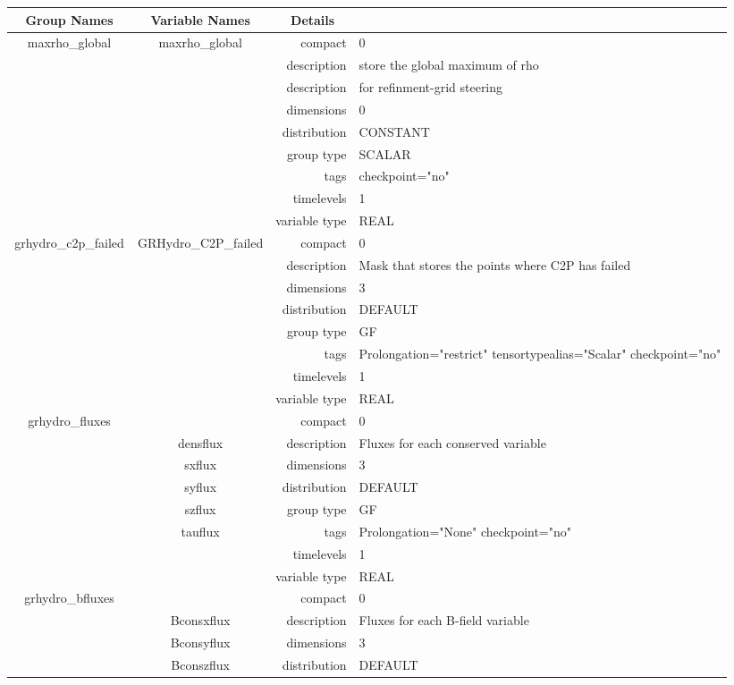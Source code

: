 \documentclass{article}
\begin{document}
\begin{tabular*}{150mm}{|c|c@{\extracolsep{\fill}}|rl|} \hline 
~ {\bf Group Names} ~ & ~ {\bf Variable Names} ~  &{\bf Details} ~ & ~ \\ 
\hline 
maxrho\_global & maxrho\_global & compact & 0 \\ 
 &  & description & store the global maximum of rho \\ 
& ~ & description &  for refinment-grid steering \\ 
 &  & dimensions & 0 \\ 
 &  & distribution & CONSTANT \\ 
 &  & group type & SCALAR \\ 
 &  & tags & checkpoint="no" \\ 
 &  & timelevels & 1 \\ 
 &  & variable type & REAL \\ 
\hline 
grhydro\_c2p\_failed & GRHydro\_C2P\_failed & compact & 0 \\ 
 &  & description & Mask that stores the points where C2P has failed \\ 
 &  & dimensions & 3 \\ 
 &  & distribution & DEFAULT \\ 
 &  & group type & GF \\ 
 &  & tags & Prolongation="restrict" tensortypealias="Scalar" checkpoint="no" \\ 
 &  & timelevels & 1 \\ 
 &  & variable type & REAL \\ 
\hline 
grhydro\_fluxes &  & compact & 0 \\ 
 & densflux & description & Fluxes for each conserved variable \\ 
 & sxflux & dimensions & 3 \\ 
 & syflux & distribution & DEFAULT \\ 
 & szflux & group type & GF \\ 
 & tauflux & tags & Prolongation="None" checkpoint="no" \\ 
 &  & timelevels & 1 \\ 
 &  & variable type & REAL \\ 
\hline 
grhydro\_bfluxes &  & compact & 0 \\ 
 & Bconsxflux & description & Fluxes for each B-field variable \\ 
 & Bconsyflux & dimensions & 3 \\ 
 & Bconszflux & distribution & DEFAULT \\ 

\end{tabular*}
\end{document}
